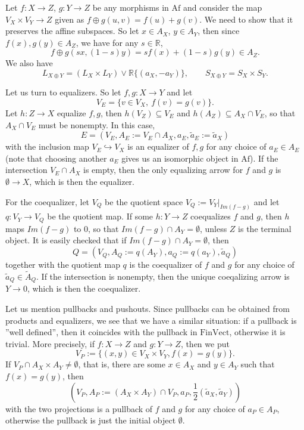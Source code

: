 \documentclass[12pt]{article}
\theoremstyle{definition}
\theoremstyle{remark}
\def \Af{\mathrm{Af}}
\def \FV{\mathrm{FinVect}}
\def\bE{ E}
\def\bX{ X}
\def\bY{ Y}
\def\bZ{Z}
\begin{document}
Let  $f:\bX\to \bZ$, $g:\bY\to \bZ$ be any morphisms in $\Af$ and consider the map
$V_\bX\times V_\bY\to \bZ$ given as
$f\oplus g(u,v)=f(u)+g(v)$. We need to show that it preserves the affine subspaces. So let 
$x\in A_\bX$, $y\in  A_\bY$, then since $f(x),g(y)\in A_\bZ$, we have for any $s\in \mathbb R$,
\[
f\oplus g(sx,(1-s)y)=sf(x)+(1-s)g(y)\in A_\bZ.
\]
We also have
\[
L_{X\oplus Y}= (L_X\times L_Y)\vee \mathbb R\{(a_X,-a_Y)\},\qquad S_{X\oplus Y}=S_X\times
S_Y.
\]


Let us turn to equalizers. So let $f,g:\bX\to \bY$ and let 
\[
V_E=\{v\in V_\bX,\ f(v)=g(v)\}. 
\]
Let $h: \bZ\to \bX$ equalize $f,g$, then $h(V_\bZ)\subseteq V_E$ and $h(A_\bZ)\subseteq
A_\bX\cap V_E$, so that $A_\bX\cap V_E$ must be nonempty. In this case, 
\[
\bE=(V_E, A_E:=V_E\cap A_\bX, a_E,\tilde a_E:=\tilde a_X)
\]
with the inclusion map $V_E\hookrightarrow V_\bX$ is an
equalizer of $f,g$ for any choice of $a_E\in A_E$ (note that choosing another $a_E$ gives
us an isomorphic object in $\Af$). If the
intersection $V_E\cap A_\bX$ is empty, then the only equalizing arrow 
for $f$ and $g$ is $\emptyset\to \bX$, which is
then the equalizer.

For the coequalizer, let $V_Q$ be the quotient space $V_Q:=V_\bY|_{Im(f-g)}$ and let
$q:V_\bY\to V_Q$
be the quotient map. If  some $h: \bY\to \bZ$ coequalizes $f$ and $g$, then $h$ maps
$Im(f-g)$ to 0, so that $Im(f-g)\cap A_\bY=\emptyset$, unless $\bZ$ is the terminal
object. It is easily checked that if $Im(f-g)\cap A_\bY=\emptyset$, then
\[
Q=(V_Q,A_Q:=q(A_\bY),a_Q:=q(a_Y),\tilde a_Q )
\]
together with the quotient map  $q$ is the
coequalizer of $f$ and $g$ for any choice of $\tilde a_Q\in \tilde A_Q$.
If the intersection is nonempty,
then the unique coeqalizing arrow is $\bY\to 0$, which is then the coequalizer.

Let us mention pullbacks and pushouts. Since pullbacks can be obtained from products and
equalizers, we see that we have a similar situation: if a pullback is ''well defined'',
then it coincides with the pullback in $\FV$, otherwise it is trivial. More precisely, if 
$f:\bX\to \bZ$ and $g:\bY\to \bZ$, then we put 
\[
V_P:=\{(x,y)\in V_\bX\times V_\bY, f(x)=g(y)\}.
\]
If $V_P\cap A_\bX\times A_\bY\ne \emptyset$, that is, there are some $x\in A_\bX$ and $y\in
A_\bY$ such that $f(x)=g(y)$, then 
\[
(V_P,A_P:=(A_\bX\times A_\bY)\cap V_P, a_P, \frac 12(\tilde a_X,\tilde a_Y))
\]
with the two projections
is a pullback of $f$ and $g$ for any choice of $a_P\in A_P$, otherwise the pullback is
just the initial object $\emptyset$.
\end{document}

